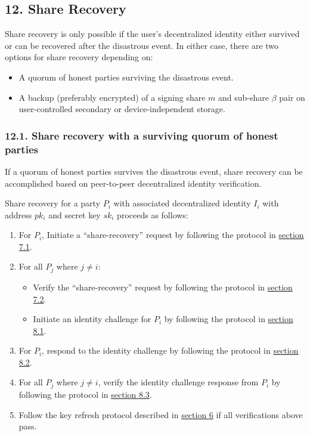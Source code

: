 \documentclass[
]{article}
\providecommand{\tightlist}{%
  \setlength{\itemsep}{0pt}\setlength{\parskip}{0pt}}
\begin{document}
\hypertarget{share-recovery}{%
\subsection{12. Share Recovery}\label{share-recovery}}

Share recovery is only possible if the user's decentralized identity
either survived or can be recovered after the disastrous event. In
either case, there are two options for share recovery depending on:

\begin{itemize}
\tightlist
\item
  A quorum of honest parties surviving the disastrous event.
\item
  A backup (preferably encrypted) of a signing share \(m\) and sub-share
  \(\beta\) pair on user-controlled secondary or device-independent
  storage.
\end{itemize}

\hypertarget{share-recovery-quorum}{%
\subsubsection{12.1. Share recovery with a surviving quorum of honest
parties}\label{share-recovery-quorum}}

If a quorum of honest parties survives the disastrous event, share
recovery can be accomplished based on peer-to-peer decentralized
identity verification.

Share recovery for a party \(P_i\) with associated decentralized
identity \(I_i\) with address \(pk_i\) and secret key \(sk_i\) proceeds
as follows:

\begin{enumerate}
\def\labelenumi{\arabic{enumi}.}
\tightlist
\item
  For \(P_i\), Initiate a ``share-recovery'' request by following the
  protocol in
  \protect\hyperlink{identity-authed-request-initiation}{section 7.1}.
\item
  For all \(P_j\) where \(j \neq i\):

  \begin{itemize}
  \tightlist
  \item
    Verify the ``share-recovery'' request by following the protocol in
    \protect\hyperlink{identity-authed-request-verification}{section
    7.2}.
  \item
    Initiate an identity challenge for \(P_i\) by following the protocol
    in \protect\hyperlink{identity-challenge-initiation}{section 8.1}.
  \end{itemize}
\item
  For \(P_i\), respond to the identity challenge by following the
  protocol in \protect\hyperlink{identity-challenge-response}{section
  8.2}.
\item
  For all \(P_j\) where \(j \neq i\), verify the identity challenge
  response from \(P_i\) by following the protocol in
  \protect\hyperlink{identity-challenge-verification}{section 8.3}.
\item
  Follow the key refresh protocol described in
  \protect\hyperlink{key-refresh}{section 6} if all verifications above
  pass.
\end{enumerate}
\end{document}
